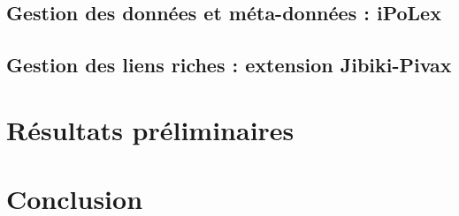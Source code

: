 \documentclass[10pt,a4paper,twoside]{article}
\begin{document}
\cite{MMCE11}

\cite{MMAC06}

\subsection{Gestion des données et méta-données : iPoLex}


\subsection{Gestion des liens riches : extension Jibiki-Pivax}


\section{Résultats préliminaires}



\section{Conclusion}
\end{document}

